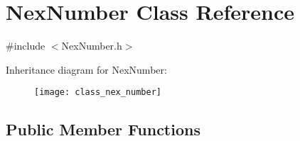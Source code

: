 \hypertarget{class_nex_number}{\section{Nex\+Number Class Reference}
\label{class_nex_number}
}


{\ttfamily \#include $<$Nex\+Number.\+h$>$}

Inheritance diagram for Nex\+Number\+:\begin{figure}[H]
\begin{center}
\leavevmode
\texttt{[image: class\_nex\_number]}
\end{center}
\end{figure}
\subsection*{Public Member Functions}
